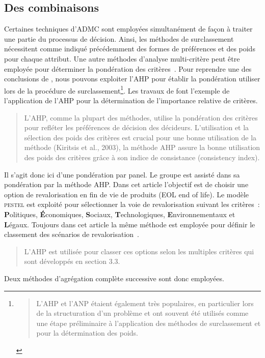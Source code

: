 \subsection{Des combinaisons}
Certaines techniques d'ADMC sont employées simultanément de façon à traiter une partie du processus de décision.
Ainsi, les méthodes de surclassement nécessitent comme indiqué précédemment des formes de préférences et des poids pour chaque attribut.
Une autre méthodes d'analyse multi-critère peut être employée pour déterminer la pondération des critères~\cite{myllyviita_impact_2014, kaya_integrated_2011, geldermann_fuzzy_2000}.
Pour reprendre une des conclusions de \citeauthor{herva_review_2013}, nous pouvons exploiter l'\gls{AHP} pour établir la pondération utiliser lors de la procédure de surclassement\footnote{
\blockcquote[traduction]{herva_review_2013}{
L'AHP et l'ANP étaient également très populaires, en particulier lors de la structuration d'un problème et ont souvent été utilisés comme une étape préliminaire à l'application des méthodes de surclassement et pour la détermination des poids.
}
}.
Les travaux de \citeauthor{ziout_holistic_2014} font l'exemple de l'application de l'AHP pour la détermination de l'importance relative de critères.
\blockcquote[traduction]{ziout_holistic_2014}{
L'AHP, comme la plupart des méthodes, utilise la pondération des critères pour refléter les préférences de décision des décideurs.
L'utilisation et la sélection des poids des critères est crucial pour une bonne utilisation de la méthode (Kiritsis et al., 2003), la méthode AHP assure la bonne utilisation des poids des critères grâce à son indice de consistance (consistency index).
}
Il s'agit donc ici d'une pondération par panel. %
Le groupe est assisté dans sa pondération par la méthode AHP.
Dans cet article l'objectif est de choisir une option de revalorisation en fin de vie de produits (EOL end of life).
Le modèle \textsc{pestel} est exploité pour sélectionner la voie de revalorisation suivant les critères~: \textbf{P}olitiques, \textbf{É}conomiques, \textbf{S}ociaux, \textbf{T}echnologiques, \textbf{E}nvironnementaux et \textbf{L}égaux.
Toujours dans cet article la même méthode est employée pour définir le classement des scénarios de revalorisation~\cite{ziout_holistic_2014}.
\blockcquote{ziout_holistic_2014}{
L'AHP est utilisée pour classer ces options selon les multiples critères qui sont développés en section 3.3.
}
Deux méthodes d'agrégation complète successive sont donc employées.

